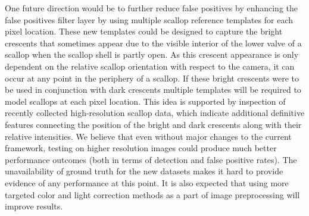 One future direction would be to further reduce false positives by enhancing the false positives filter layer by using multiple scallop reference templates for each pixel location. 
These new templates could be designed to capture the bright crescents that sometimes appear due to the visible interior of the lower valve of a scallop when the scallop shell is partly open. As this crescent appearance is only dependent on the relative scallop orientation with respect to the camera, it can occur at any point in the periphery of a scallop. If these bright crescents were to be used in conjunction with dark crescents multiple templates will be required to model scallops at each pixel location.
This idea is supported by inspection of recently collected high-resolution scallop data, which indicate additional definitive features connecting the position of the bright and dark crescents along with their relative intensities. 
We believe that even without major changes to the current framework, testing on higher resolution images could produce much better performance outcomes (both in terms of detection and false positive rates). 
The unavailability of ground truth for the new datasets makes it hard to provide evidence of any performance at this point. 
It is also expected that using more targeted color and light correction methods \cite{dawkings13} as a part of image preprocessing will improve results.

